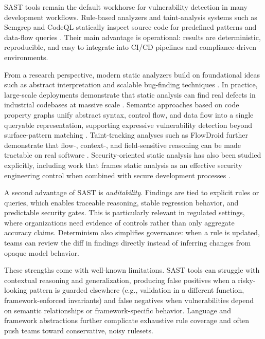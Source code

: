 SAST tools remain the default workhorse for vulnerability detection in many development workflows. Rule-based analyzers and taint-analysis systems such as Semgrep and CodeQL statically inspect source code for predefined patterns and data-flow queries \cite{semgrepDocs,codeqlDocs}. Their main advantage is operational: results are deterministic, reproducible, and easy to integrate into CI/CD pipelines and compliance-driven environments.

From a research perspective, modern static analyzers build on foundational ideas such as abstract interpretation \cite{cousot1977abstract} and scalable bug-finding techniques \cite{engler2001bugs}. In practice, large-scale deployments demonstrate that static analysis can find real defects in industrial codebases at massive scale \cite{bessey2010billion,calcagno2015infer}. Semantic approaches based on code property graphs unify abstract syntax, control flow, and data flow into a single queryable representation, supporting expressive vulnerability detection beyond surface-pattern matching \cite{yamaguchi2014cpg}. Taint-tracking analyses such as FlowDroid further demonstrate that flow-, context-, and field-sensitive reasoning can be made tractable on real software \cite{arzt2014flowdroid}. Security-oriented static analysis has also been studied explicitly, including work that frames static analysis as an effective security engineering control when combined with secure development processes \cite{chess2004staticanalysis,howard2006sdl}.

A second advantage of SAST is \emph{auditability}. Findings are tied to explicit rules or queries, which enables traceable reasoning, stable regression behavior, and predictable security gates. This is particularly relevant in regulated settings, where organizations need evidence of controls rather than only aggregate accuracy claims. Determinism also simplifies governance: when a rule is updated, teams can review the diff in findings directly instead of inferring changes from opaque model behavior.

These strengths come with well-known limitations. SAST tools can struggle with contextual reasoning and generalization, producing false positives when a risky-looking pattern is guarded elsewhere (e.g., validation in a different function, framework-enforced invariants) and false negatives when vulnerabilities depend on semantic relationships or framework-specific behavior. Language and framework abstractions further complicate exhaustive rule coverage and often push teams toward conservative, noisy rulesets.

